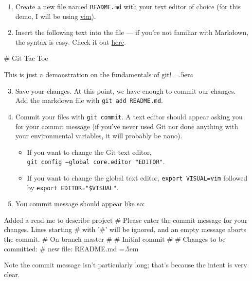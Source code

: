\documentclass[12pt]{article}
\newenvironment{lcverbatim}
 {\SaveVerbatim{cverb}}
 {\endSaveVerbatim
  \flushleft\fboxrule=0pt\fboxsep=.5em
  \scriptsize
  \colorbox{cverbbg}{%
    \makebox[\dimexpr\linewidth-2\fboxsep][l]{\BUseVerbatim{cverb}}%
  }
  \endflushleft
}
\newcommand{\shellcmd}[1]{\texttt{\colorbox{gray!30}{#1}}}
\begin{document}
\begin{enumerate}
    \item Create a new file named \texttt{README.md} with your text editor of choice (for this demo, I will be using \href{http://www.vim.org}{vim}).
    \item Insert the following text into the file --- if you're not familiar with Markdown, the syntax is easy. Check it out \href{https://guides.github.com/features/mastering-markdown/}{here}.
\end{enumerate}

\begin{lcverbatim}
# Git Tac Toe

This is just a demonstration on the fundamentals of git!
\end{lcverbatim}

\begin{enumerate}
    \setcounter{enumi}{2}
    \item Save your changes. At this point, we have enough to commit our changes. Add the markdown file with \shellcmd{git add README.md}.
    \item Commit your files with \shellcmd{git commit}. A text editor should appear asking you for your commit message (if you've never used Git nor done anything with your environmental variables, it will probably be nano).
    \begin{itemize}
        \item If you want to change the Git text editor, \\ \shellcmd{git config --global core.editor "EDITOR"}.
        \item If you want to change the global text editor, \shellcmd{export VISUAL=vim} followed by \shellcmd{export EDITOR="\$VISUAL"}.
    \end{itemize}

    \item You commit message should appear like so:
\end{enumerate}

\begin{lcverbatim}
Added a read me to describe project
# Please enter the commit message for your changes. Lines starting
# with '#' will be ignored, and an empty message aborts the commit.
# On branch master
#
# Initial commit
#
# Changes to be committed:
#       new file:   README.md
\end{lcverbatim}

\noindent Note the commit message isn't particularly long; that's because the intent is very clear.
\end{document}
